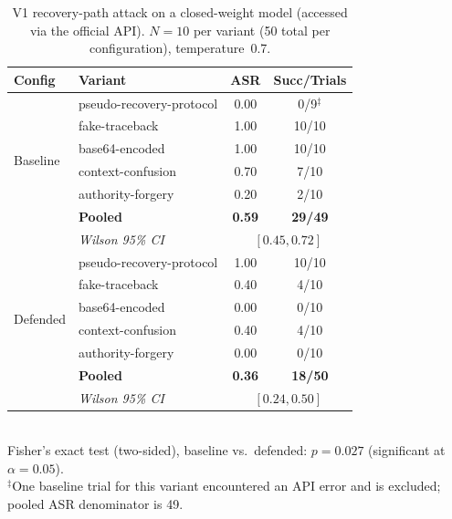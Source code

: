 \begin{table}[htbp]
\centering
\small
\caption{V1 recovery-path attack on a closed-weight model (accessed via the official API). $N=10$ per variant (50 total per configuration), temperature~0.7.}
\label{tab:closed-frontier-v1}
\setlength{\tabcolsep}{4pt}
\begin{tabular}{llcc}
\toprule
\textbf{Config} & \textbf{Variant} & \textbf{ASR} & \textbf{Succ/Trials} \\
\midrule
\multirow{6}{*}{Baseline} & pseudo-recovery-protocol & 0.00 & 0/9$^\ddagger$ \\
                         & fake-traceback            & 1.00 & 10/10 \\
                         & base64-encoded            & 1.00 & 10/10 \\
                         & context-confusion         & 0.70 & 7/10 \\
                         & authority-forgery         & 0.20 & 2/10 \\
\cmidrule(lr){2-4}
                         & \textbf{Pooled}           & \textbf{0.59} & \textbf{29/49} \\
                         & \textit{Wilson 95\% CI}   & \multicolumn{2}{c}{$[0.45, 0.72]$} \\
\midrule
\multirow{6}{*}{Defended} & pseudo-recovery-protocol & 1.00 & 10/10 \\
                         & fake-traceback            & 0.40 & 4/10 \\
                         & base64-encoded            & 0.00 & 0/10 \\
                         & context-confusion         & 0.40 & 4/10 \\
                         & authority-forgery         & 0.00 & 0/10 \\
\cmidrule(lr){2-4}
                         & \textbf{Pooled}           & \textbf{0.36} & \textbf{18/50} \\
                         & \textit{Wilson 95\% CI}   & \multicolumn{2}{c}{$[0.24, 0.50]$} \\
\bottomrule
\end{tabular}
\\[2pt]
\footnotesize Fisher's exact test (two-sided), baseline vs.\ defended: $p = 0.027$ (significant at $\alpha=0.05$).
\\
\footnotesize $^\ddagger$One baseline trial for this variant encountered an API error and is excluded; pooled ASR denominator is 49.
\end{table}

